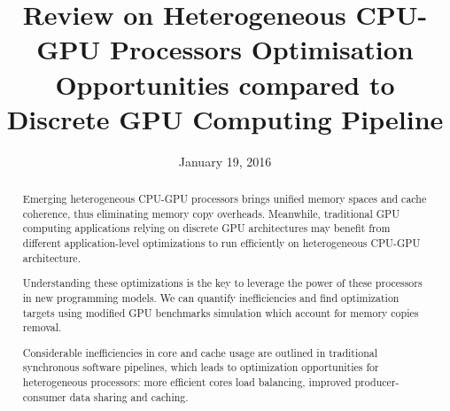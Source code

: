 \documentclass[11pt,twoside,a4paper]{article}
\title{\vspace{-15mm}\fontsize{17pt}{10pt}\selectfont\textbf{Review on
Heterogeneous CPU-GPU Processors Optimisation Opportunities compared to
Discrete GPU Computing Pipeline}\vspace{-1em}} %
\author{}
\date{January 19, 2016}
\begin{document}
\maketitle

\thispagestyle{fancy} %

\begin{abstract}

\vspace{-.5em}\noindent Emerging heterogeneous CPU-GPU processors brings unified memory spaces and
cache coherence, thus eliminating memory copy overheads. Meanwhile,
traditional GPU computing applications relying on discrete GPU architectures
may benefit from different application-level optimizations to run efficiently
on heterogeneous CPU-GPU architecture.

Understanding these optimizations is the key to leverage the
power of these processors in new programming models. We can quantify
inefficiencies and find optimization targets using modified GPU benchmarks
simulation which account for memory copies removal.

Considerable inefficiencies in core and cache usage are outlined in
traditional synchronous software pipelines, which leads to optimization
opportunities for heterogeneous processors: more efficient cores load
balancing, improved producer-consumer data sharing and caching.

\end{abstract}

\bigskip
\end{document}

